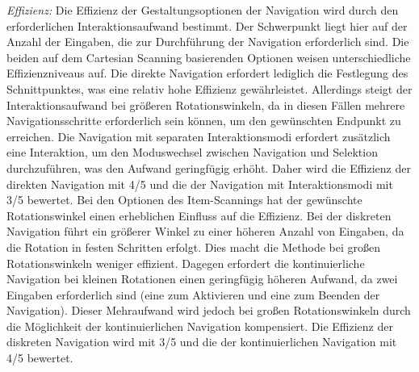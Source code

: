 \textit{Effizienz:}
Die Effizienz der Gestaltungsoptionen der Navigation wird durch den erforderlichen Interaktionsaufwand bestimmt. Der Schwerpunkt liegt hier auf der Anzahl der Eingaben, die zur Durchführung der Navigation erforderlich sind. Die beiden auf dem Cartesian Scanning basierenden Optionen weisen unterschiedliche Effizienzniveaus auf. Die direkte Navigation erfordert lediglich die Festlegung des Schnittpunktes, was eine relativ hohe Effizienz gewährleistet. Allerdings steigt der Interaktionsaufwand bei größeren Rotationswinkeln, da in diesen Fällen mehrere Navigationsschritte erforderlich sein können, um den gewünschten Endpunkt zu erreichen. Die Navigation mit separaten Interaktionsmodi erfordert zusätzlich eine Interaktion, um den Moduswechsel zwischen Navigation und Selektion durchzuführen, was den Aufwand geringfügig erhöht. Daher wird die Effizienz der direkten Navigation mit 4/5 und die der Navigation mit Interaktionsmodi mit 3/5 bewertet.
Bei den Optionen des Item-Scannings hat der gewünschte Rotationswinkel einen erheblichen Einfluss auf die Effizienz. Bei der diskreten Navigation führt ein größerer Winkel zu einer höheren Anzahl von Eingaben, da die Rotation in festen Schritten erfolgt. Dies macht die Methode bei großen Rotationswinkeln weniger effizient. Dagegen erfordert die kontinuierliche Navigation bei kleinen Rotationen einen geringfügig höheren Aufwand, da zwei Eingaben erforderlich sind (eine zum Aktivieren und eine zum Beenden der Navigation). Dieser Mehraufwand wird jedoch bei großen Rotationswinkeln durch die Möglichkeit der kontinuierlichen Navigation kompensiert. Die Effizienz der diskreten Navigation wird mit 3/5 und die der kontinuierlichen Navigation mit 4/5 bewertet.

